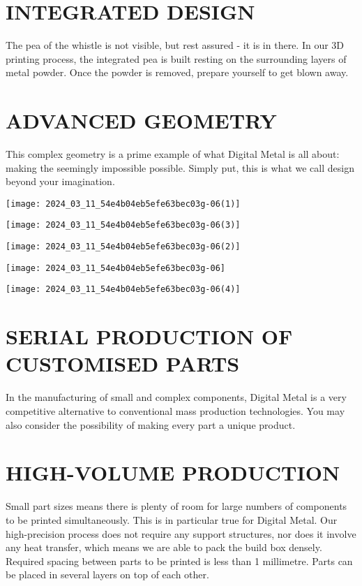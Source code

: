 \documentclass[10pt]{article}
\begin{document}
\section*{INTEGRATED DESIGN}
The pea of the whistle is not visible, but rest assured - it is in there. In our 3D printing process, the integrated pea is built resting on the surrounding layers of metal powder. Once the powder is removed, prepare yourself to get blown away.

\section*{ADVANCED GEOMETRY}
This complex geometry is a prime example of what Digital Metal is all about: making the seemingly impossible possible. Simply put, this is what we call design beyond your imagination.

\begin{center}
\texttt{[image: 2024\_03\_11\_54e4b04eb5efe63bec03g-06(1)]}
\end{center}

\begin{center}
\texttt{[image: 2024\_03\_11\_54e4b04eb5efe63bec03g-06(3)]}
\end{center}

\begin{center}
\texttt{[image: 2024\_03\_11\_54e4b04eb5efe63bec03g-06(2)]}
\end{center}

\begin{center}
\texttt{[image: 2024\_03\_11\_54e4b04eb5efe63bec03g-06]}
\end{center}

\begin{center}
\texttt{[image: 2024\_03\_11\_54e4b04eb5efe63bec03g-06(4)]}
\end{center}

\section*{SERIAL PRODUCTION OF CUSTOMISED PARTS}
In the manufacturing of small and complex components, Digital Metal is a very competitive alternative to conventional mass production technologies. You may also consider the possibility of making every part a unique product.

\section*{HIGH-VOLUME PRODUCTION}
Small part sizes means there is plenty of room for large numbers of components to be printed simultaneously. This is in particular true for Digital Metal. Our high-precision process does not require any support structures, nor does it involve any heat transfer, which means we are able to pack the build box densely. Required spacing between parts to be printed is less than 1 millimetre. Parts can be placed in several layers on top of each other.
\end{document}
